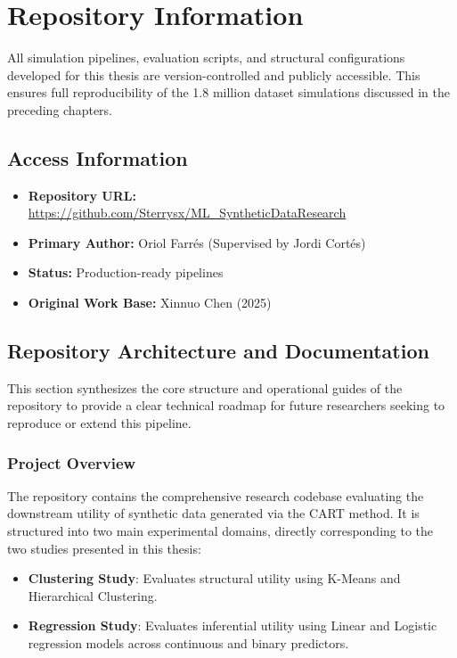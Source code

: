 \chapter{Repository Information}
\label{chap:repository}

All simulation pipelines, evaluation scripts, and structural configurations developed for this thesis are version-controlled and publicly accessible. This ensures full reproducibility of the 1.8 million dataset simulations discussed in the preceding chapters.

\section{Access Information}
\begin{itemize}
    \item \textbf{Repository URL:} \url{https://github.com/Sterrysx/ML_SyntheticDataResearch}
    \item \textbf{Primary Author:} Oriol Farr\'es (Supervised by Jordi Cort\'es)
    \item \textbf{Status:} Production-ready pipelines
    \item \textbf{Original Work Base:} Xinnuo Chen (2025)
\end{itemize}

\section{Repository Architecture and Documentation}
This section synthesizes the core structure and operational guides of the repository to provide a clear technical roadmap for future researchers seeking to reproduce or extend this pipeline.

\subsection{Project Overview}
The repository contains the comprehensive research codebase evaluating the downstream utility of synthetic data generated via the CART method. It is structured into two main experimental domains, directly corresponding to the two studies presented in this thesis:
\begin{itemize}
    \item \textbf{Clustering Study}: Evaluates structural utility using K-Means and Hierarchical Clustering.
    \item \textbf{Regression Study}: Evaluates inferential utility using Linear and Logistic regression models across continuous and binary predictors.
\end{itemize}

